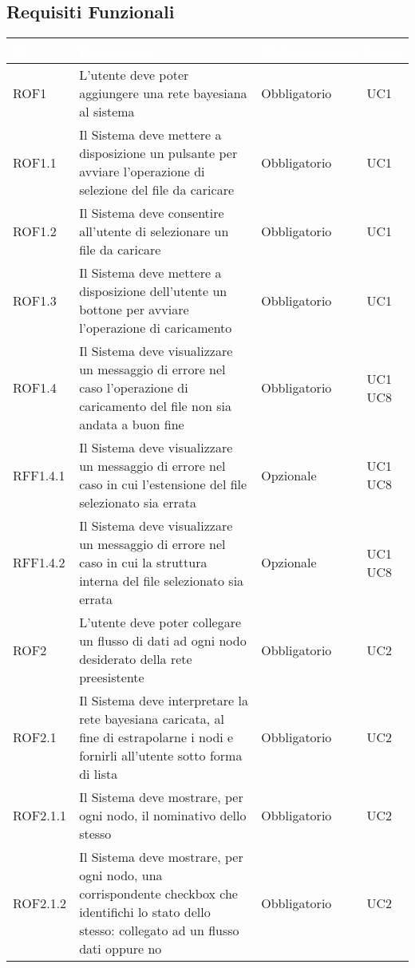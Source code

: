 \newpage
\subsection{Requisiti Funzionali}\label{RF}
\begin{center}
\begin{longtable}[c]{|m{}|m{}|m{}|m{}|}
\hline
\rowcolor{bluelogo}\textbf{\textcolor{white}{ID}} & \textbf{\textcolor{white}{Descrizione}} & \textbf{\textcolor{white}{Obbligatorietà}} & \textbf{\textcolor{white}{Fonti}}\\
\hline \hline
\endhead
ROF1 & L'utente deve poter aggiungere una rete bayesiana al sistema & Obbligatorio & UC1\\
\hline
\rowcolor{grigio}ROF1.1 & Il Sistema deve mettere a disposizione un pulsante per avviare l'operazione di selezione del file da caricare & Obbligatorio & UC1\\
\hline
ROF1.2 & Il Sistema deve consentire all'utente di selezionare un file da caricare & Obbligatorio & UC1\\
\hline
\rowcolor{grigio}ROF1.3 & Il Sistema deve mettere a disposizione dell'utente un bottone per avviare l'operazione di caricamento & Obbligatorio & UC1\\
\hline
ROF1.4 & Il Sistema deve visualizzare un messaggio di errore nel caso l'operazione di caricamento del file non sia andata a buon fine & Obbligatorio & UC1 UC8\\
\hline
\rowcolor{grigio}RFF1.4.1 & Il Sistema deve visualizzare un messaggio di errore nel caso in cui l'estensione del file selezionato sia errata & Opzionale & UC1 UC8\\
\hline
RFF1.4.2 & Il Sistema deve visualizzare un messaggio di errore nel caso in cui la struttura interna del file selezionato sia errata & Opzionale & UC1 UC8\\
\hline
\rowcolor{grigio}ROF2 & L'utente deve poter collegare un flusso di dati ad ogni nodo desiderato della rete preesistente & Obbligatorio & UC2\\
\hline
ROF2.1 & Il Sistema deve interpretare la rete bayesiana caricata, al fine di estrapolarne i nodi e fornirli all'utente sotto forma di lista & Obbligatorio & UC2\\
\hline
\rowcolor{grigio}ROF2.1.1 & Il Sistema deve mostrare, per ogni nodo, il nominativo dello stesso & Obbligatorio & UC2\\
\hline
ROF2.1.2 & Il Sistema deve mostrare, per ogni nodo, una corrispondente checkbox che identifichi lo stato dello stesso: collegato ad un flusso dati oppure no & Obbligatorio & UC2\\

\end{longtable}
\end{center}

